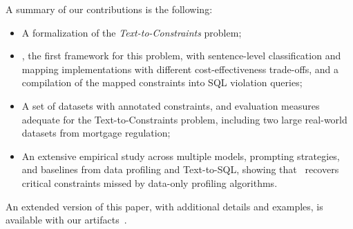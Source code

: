 A summary of our contributions is the following:
\begin{itemize}[leftmargin=0.35cm]
\item A formalization of the \emph{Text-to-Constraints} problem;
\item \system, the first framework for this problem, with sentence-level classification and mapping implementations with different cost-effectiveness trade-offs, and a compilation of the mapped constraints into SQL violation queries;
\item A set of datasets with annotated constraints, and evaluation measures adequate for the Text-to-Constraints problem, including two large real-world datasets from mortgage regulation;
\item An extensive empirical study across multiple models, prompting strategies, and baselines from data profiling and Text-to-SQL, showing that \system\ recovers critical constraints missed by data-only profiling algorithms.
\end{itemize}
\noindent An extended version of this paper, with additional details and examples, is available with our artifacts~\cite{normafull}.


